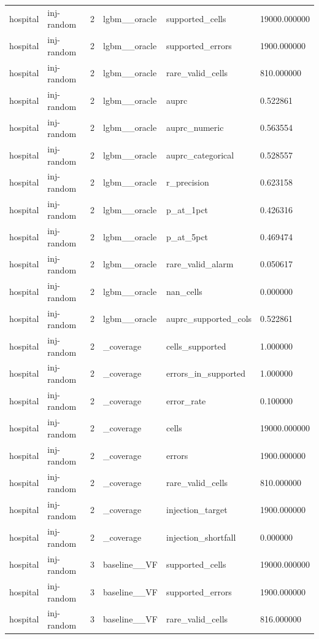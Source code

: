 \begin{tabular}{llllll}
hospital & inj-random & 2 & lgbm\_\_oracle & supported\_cells & 19000.000000 \\
hospital & inj-random & 2 & lgbm\_\_oracle & supported\_errors & 1900.000000 \\
hospital & inj-random & 2 & lgbm\_\_oracle & rare\_valid\_cells & 810.000000 \\
hospital & inj-random & 2 & lgbm\_\_oracle & auprc & 0.522861 \\
hospital & inj-random & 2 & lgbm\_\_oracle & auprc\_numeric & 0.563554 \\
hospital & inj-random & 2 & lgbm\_\_oracle & auprc\_categorical & 0.528557 \\
hospital & inj-random & 2 & lgbm\_\_oracle & r\_precision & 0.623158 \\
hospital & inj-random & 2 & lgbm\_\_oracle & p\_at\_1pct & 0.426316 \\
hospital & inj-random & 2 & lgbm\_\_oracle & p\_at\_5pct & 0.469474 \\
hospital & inj-random & 2 & lgbm\_\_oracle & rare\_valid\_alarm & 0.050617 \\
hospital & inj-random & 2 & lgbm\_\_oracle & nan\_cells & 0.000000 \\
hospital & inj-random & 2 & lgbm\_\_oracle & auprc\_supported\_cols & 0.522861 \\
hospital & inj-random & 2 & \_coverage & cells\_supported & 1.000000 \\
hospital & inj-random & 2 & \_coverage & errors\_in\_supported & 1.000000 \\
hospital & inj-random & 2 & \_coverage & error\_rate & 0.100000 \\
hospital & inj-random & 2 & \_coverage & cells & 19000.000000 \\
hospital & inj-random & 2 & \_coverage & errors & 1900.000000 \\
hospital & inj-random & 2 & \_coverage & rare\_valid\_cells & 810.000000 \\
hospital & inj-random & 2 & \_coverage & injection\_target & 1900.000000 \\
hospital & inj-random & 2 & \_coverage & injection\_shortfall & 0.000000 \\
hospital & inj-random & 3 & baseline\_\_VF & supported\_cells & 19000.000000 \\
hospital & inj-random & 3 & baseline\_\_VF & supported\_errors & 1900.000000 \\
hospital & inj-random & 3 & baseline\_\_VF & rare\_valid\_cells & 816.000000 \\

\end{tabular}
